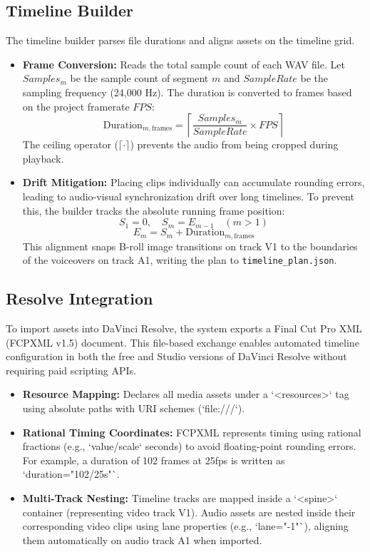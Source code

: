 \documentclass[a4paper,12pt]{report}
\begin{document}
\subsection{Timeline Builder}
The timeline builder parses file durations and aligns assets on the timeline grid.
\begin{itemize}
    \item \textbf{Frame Conversion:} Reads the total sample count of each WAV file. Let $Samples_m$ be the sample count of segment $m$ and $SampleRate$ be the sampling frequency (24,000 Hz). The duration is converted to frames based on the project framerate $FPS$:
    \begin{equation}
        \text{Duration}_{m,\text{frames}} = \left\lceil \frac{Samples_m}{SampleRate} \times FPS \right\rceil
    \end{equation}
    The ceiling operator ($\lceil \cdot \rceil$) prevents the audio from being cropped during playback.
    \item \textbf{Drift Mitigation:} Placing clips individually can accumulate rounding errors, leading to audio-visual synchronization drift over long timelines. To prevent this, the builder tracks the absolute running frame position:
    \begin{equation}
        S_1 = 0, \quad S_m = E_{m-1} \quad (m > 1)
    \end{equation}
    \begin{equation}
        E_m = S_m + \text{Duration}_{m,\text{frames}}
    \end{equation}
    This alignment snaps B-roll image transitions on track V1 to the boundaries of the voiceovers on track A1, writing the plan to \texttt{timeline\_plan.json}.
\end{itemize}

\subsection{Resolve Integration}
To import assets into DaVinci Resolve, the system exports a Final Cut Pro XML (FCPXML v1.5) document. This file-based exchange enables automated timeline configuration in both the free and Studio versions of DaVinci Resolve without requiring paid scripting APIs.
\begin{itemize}
    \item \textbf{Resource Mapping:} Declares all media assets under a `<resources>` tag using absolute paths with URI schemes (`file:///`).
    \item \textbf{Rational Timing Coordinates:} FCPXML represents timing using rational fractions (e.g., `value/scale` seconds) to avoid floating-point rounding errors. For example, a duration of 102 frames at 25fps is written as `duration="102/25s"`.
    \item \textbf{Multi-Track Nesting:} Timeline tracks are mapped inside a `<spine>` container (representing video track V1). Audio assets are nested inside their corresponding video clips using lane properties (e.g., `lane="-1"`), aligning them automatically on audio track A1 when imported.
\end{itemize}
\end{document}
